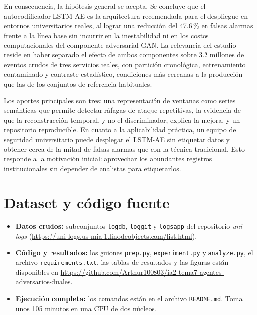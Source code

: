 \documentclass[jou,a4paper,floatsintext,donotrepeattitle]{apa7}
\begin{document}
En consecuencia, la hipótesis general se acepta. Se concluye que el autocodificador LSTM-AE es la arquitectura recomendada para el despliegue en entornos universitarios reales, al lograr una reducción del 47.6\,\% en falsas alarmas frente a la línea base sin incurrir en la inestabilidad ni en los costos computacionales del componente adversarial GAN. La relevancia del estudio reside en haber separado el efecto de ambos componentes sobre 3.2 millones de eventos crudos de tres servicios reales, con partición cronológica, entrenamiento contaminado y contraste estadístico, condiciones más cercanas a la producción que las de los conjuntos de referencia habituales.

Los aportes principales son tres: una representación de ventanas como series semánticas que permite detectar ráfagas de ataque repetitivas, la evidencia de que la reconstrucción temporal, y no el discriminador, explica la mejora, y un repositorio reproducible. En cuanto a la aplicabilidad práctica, un equipo de seguridad universitario puede desplegar el LSTM-AE sin etiquetar datos y obtener cerca de la mitad de falsas alarmas que con la técnica tradicional. Esto responde a la motivación inicial: aprovechar los abundantes registros institucionales sin depender de analistas para etiquetarlos.

\section*{Dataset y código fuente}
\begin{itemize}
  \item \textbf{Datos crudos:} subconjuntos \texttt{logdb}, \texttt{loggit} y \texttt{logsapp} del repositorio \textit{uni-logs} (\url{https://uni-logs.us-mia-1.linodeobjects.com/list.html}).
  \item \textbf{Código y resultados:} los guiones \texttt{prep.py}, \texttt{experiment.py} y \texttt{analyze.py}, el archivo \texttt{requirements.txt}, las tablas de resultados y las figuras están disponibles en \url{https://github.com/Arthur100803/ia2-tema7-agentes-adversarios-duales}.
  \item \textbf{Ejecución completa:} los comandos están en el archivo \texttt{README.md}. Toma unos 105 minutos en una CPU de dos núcleos.
\end{itemize}

\printbibliography
\end{document}
